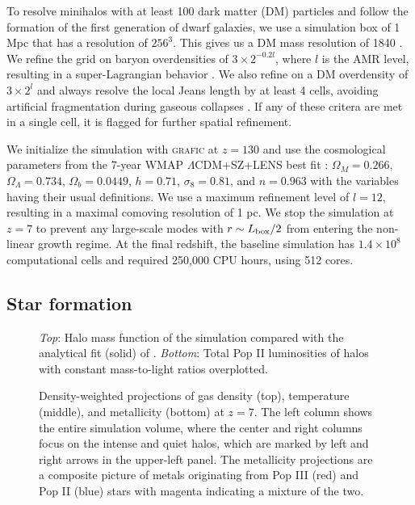 \documentclass[apjl]{emulateapj}
\newcommand{\Ms}{\ifmmode{M_\odot}\else{$M_\odot$}\fi}
\begin{document}
To resolve minihalos with at least 100 dark matter (DM) particles and
follow the formation of the first generation of dwarf galaxies, we use
a simulation box of 1 Mpc that has a resolution of $256^3$.  This
gives us a DM mass resolution of 1840 \Ms.  We refine the grid on
baryon overdensities of $3 \times 2^{-0.2l}$, where $l$ is the AMR
level, resulting in a super-Lagrangian behavior \citep[also
  see][]{OShea08}.  We also refine on a DM overdensity of $3 \times
2^l$ and always resolve the local Jeans length by at least 4 cells,
avoiding artificial fragmentation during gaseous collapses
\citep{Truelove97}.  If any of these critera are met in a single cell,
it is flagged for further spatial refinement.  

We initialize the simulation with \textsc{grafic}
\citep{Bertschinger01} at $z = 130$ and use the cosmological
parameters from the 7-year WMAP $\Lambda$CDM+SZ+LENS best fit
\citep{WMAP7}: $\Omega_M = 0.266$, $\Omega_\Lambda = 0.734$, $\Omega_b
= 0.0449$, $h = 0.71$, $\sigma_8 = 0.81$, and $n = 0.963$ with the
variables having their usual definitions.  We use a maximum refinement
level of $l = 12$, resulting in a maximal comoving resolution of 1 pc.
We stop the simulation at $z=7$ to prevent any large-scale modes with
$r \sim L_{\rm box}/2$ from entering the non-linear growth regime.  At
the final redshift, the baseline simulation has $1.4 \times 10^8$
computational cells and required 250,000 CPU hours, using 512 cores.

\subsection{Star formation}


\begin{figure}
\caption{\label{fig:massfn} \textit{Top}: Halo mass function of the
  simulation compared with the analytical fit (solid) of
  \citet{Warren06}.  \textit{Bottom}: Total Pop II luminosities of
  halos with constant mass-to-light ratios overplotted.}
\end{figure}


\begin{figure*}
\caption{\label{fig:projections} Density-weighted projections of gas
  density (top), temperature (middle), and metallicity (bottom) at
  $z=7$.  The left column shows the entire simulation volume, where
  the center and right columns focus on the intense and quiet halos,
  which are marked by left and right arrows in the upper-left panel.
  The metallicity projections are a composite picture of metals
  originating from Pop III (red) and Pop II (blue) stars with magenta
  indicating a mixture of the two.}
\end{figure*}
\end{document}
